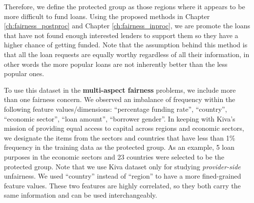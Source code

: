             Therefore, we define the protected group as those regions where it appears to be more difficult to fund loans. Using the proposed methods in Chapter \ref{ch:fairness_postproc} and Chapter \ref{ch:fairness_inproc}, we are promote the loans that have not found enough interested lenders to support them so they have a higher chance of getting funded. Note that the assumption behind this method is that all the loan requests are equally worthy regardless of all their information, in other words the more popular loans are not inherently better than the less popular ones.
        
            To use this dataset in the \textbf{multi-aspect fairness} problems, we include more than one fairness concern. We observed an imbalance of frequency within the following feature values/dimensions: ``percentage funding rate'', ``country'', ``economic sector'', ``loan amount'', ``borrower gender''. In keeping with Kiva's mission of providing equal access to capital across regions and economic sectors, we designate the items from the sectors and countries that have less than 1\% frequency in the training data as the protected group. As an example, 5 loan purposes in the economic sectors and 23 countries were selected to be the protected group. Note that we use Kiva dataset only for studying \textit{provider-side} unfairness. We used ``country'' instead of ``region'' to have a more fined-grained feature values. These two features are highly correlated, so they both carry the same information and can be used interchangeably.
        



